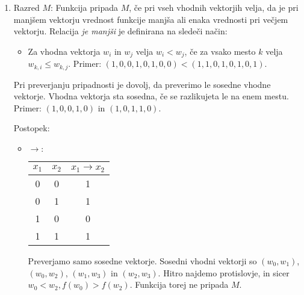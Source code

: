 \begin{resitev}
\begin{enumerate}
\item Razred $M$:
Funkcija pripada $M$, če pri vseh vhodnih vektorjih velja, da je pri manjšem vektorju vrednost funkcije manjša ali enaka vrednosti pri večjem vektorju. Relacija \emph{je manjši} je definirana na sledeči način:
\begin{itemize}
\item Za vhodna vektorja $w_i$ in $w_j$ velja $w_i < w_j$, če za vsako mesto $k$ velja $w_{k,i} \leq w_{k,j}$. Primer: $(1,0,0,1,0,1,0,0) < (1,1,0,1,0,1,0,1)$.
\end{itemize}
Pri preverjanju pripadnosti je dovolj, da preverimo le sosedne vhodne vektorje. Vhodna vektorja sta sosedna, če se razlikujeta le na enem mestu. Primer: $(1,0,0,1,0)$ in $(1,0,1,1,0)$.

Postopek:
\begin{itemize}
\item $\rightarrow:$\\
\begin{table}[ht]
\centering
\begin{tabular}{cc|c}
$x_1$ & $x_2$ & $x_1 \rightarrow x_2$\\
\hline
0 & 0 & 1\\
0 & 1 & 1\\
1 & 0 & 0\\
1 & 1 & 1
\end{tabular}
\end{table}

Preverjamo samo sosedne vektorje. Sosedni vhodni vektorji so $(w_0,w_1)$, $(w_0,w_2)$, $(w_1,w_3)$ in $(w_2,w_3)$. Hitro najdemo protislovje, in sicer $w_0 < w_2, f(w_0) > f(w_2)$. Funkcija torej ne pripada $M$.
\end{itemize}
\end{enumerate}
\end{resitev}

